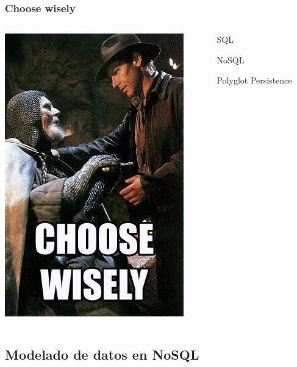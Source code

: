 \documentclass[14pt]{beamer}
\begin{document}
\begin{frame}
  \frametitle{Choose wisely}
\begin{columns}
\begin{column}{.5\textwidth}
  \includegraphics[height=.7\textheight]{img/chose-wisely}
\end{column}
\begin{column}{.5\textwidth}
\begin{alertblock}{SQL}
\end{alertblock}
\begin{alertblock}{NoSQL}
\end{alertblock}
\begin{alertblock}{Polyglot Persistence}
\end{alertblock}
\end{column}
\end{columns}
\end{frame}


\subsection{Modelado de datos en NoSQL}
\end{document}
